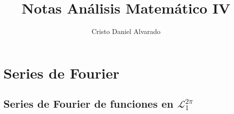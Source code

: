 \documentclass[12pt]{report}
\newcounter{it}
\theoremstyle{largebreak}
\begin{document}
    \setlength{\parskip}{5pt} %
    \setlength{\parindent}{12pt} %
    \title{Notas Análisis Matemático IV}
    \author{Cristo Daniel Alvarado}
    \maketitle

    \tableofcontents %
    
    \setcounter{chapter}{2}

    \chapter{Series de Fourier}
    
    \section{Series de Fourier de funciones en $\mathcal{L}_1^{2\pi}$}
    
\end{document}
